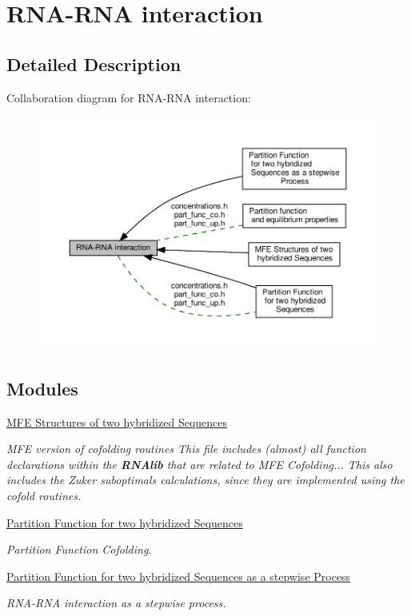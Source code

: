 \hypertarget{group__cofold}{}\section{R\+N\+A-\/\+R\+NA interaction}
\label{group__cofold}


\subsection{Detailed Description}
Collaboration diagram for R\+N\+A-\/\+R\+NA interaction\+:
\nopagebreak
\begin{figure}[H]
\begin{center}
\leavevmode
\includegraphics[width=350pt]{group__cofold}
\end{center}
\end{figure}
\subsection*{Modules}
\begin{DoxyCompactItemize}
\item 
\hyperlink{group__mfe__cofold}{M\+F\+E Structures of two hybridized Sequences}
\begin{DoxyCompactList}\small\item\em M\+FE version of cofolding routines This file includes (almost) all function declarations within the {\bfseries R\+N\+Alib} that are related to M\+FE Cofolding... This also includes the Zuker suboptimals calculations, since they are implemented using the cofold routines. \end{DoxyCompactList}\item 
\hyperlink{group__pf__cofold}{Partition Function for two hybridized Sequences}
\begin{DoxyCompactList}\small\item\em Partition Function Cofolding. \end{DoxyCompactList}\item 
\hyperlink{group__up__cofold}{Partition Function for two hybridized Sequences as a stepwise Process}
\begin{DoxyCompactList}\small\item\em R\+N\+A-\/\+R\+NA interaction as a stepwise process. \end{DoxyCompactList}\end{DoxyCompactItemize}
